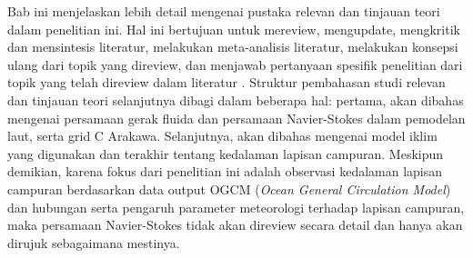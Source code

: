 \vspace{1.5pc}
\begin{spacing}{1.5}
	
	Bab ini menjelaskan lebih detail mengenai pustaka relevan dan tinjauan teori dalam penelitian ini. Hal ini bertujuan untuk mereview, mengupdate, mengkritik dan mensintesis literatur, melakukan meta-analisis literatur, melakukan konsepsi ulang dari topik yang direview, dan menjawab pertanyaan spesifik penelitian dari topik yang telah direview dalam literatur . Struktur pembahasan studi relevan dan tinjauan teori selanjutnya dibagi dalam beberapa hal: pertama, akan dibahas mengenai persamaan gerak fluida dan persamaan Navier-Stokes dalam pemodelan laut, serta grid C Arakawa. Selanjutnya, akan dibahas mengenai model iklim yang digunakan dan terakhir tentang kedalaman lapisan campuran. Meskipun demikian, karena fokus dari penelitian ini adalah observasi kedalaman lapisan campuran berdasarkan data output OGCM (\textit{Ocean General Circulation Model}) dan hubungan serta pengaruh parameter meteorologi terhadap lapisan campuran, maka persamaan Navier-Stokes tidak akan direview secara detail dan hanya akan dirujuk sebagaimana mestinya.
	
\end{spacing}
\vspace{-0.1pc}
